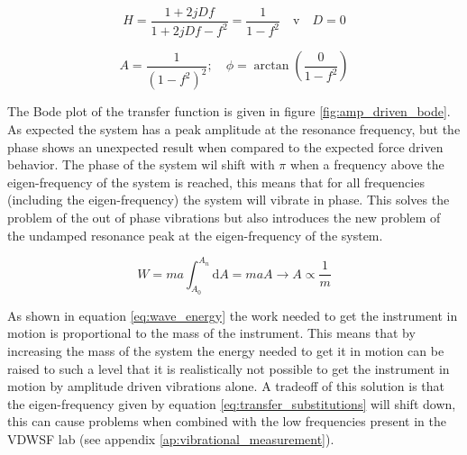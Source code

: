 \documentclass[10pt]{article}
\begin{document}
\begin{equation}
    H = \frac{1 + 2jDf}{1+ 2jDf - f^2} = \frac{1}{1 - f^2}\quad \mathrm{v}\quad D = 0
    \label{eq:trilling overdracht zonder demping}
\end{equation}

\begin{equation}
    A = \frac{1}{(1-f^2)^2}; \quad \phi = \arctan{\left( \frac{0}{1 - f^2}\right)}
    \label{eq:bode_amplitude}
\end{equation}

The Bode plot of the transfer function is given in figure \ref{fig:amp_driven_bode}.
As expected the system has a peak amplitude at the resonance frequency, but the phase shows an unexpected result when compared to the expected force driven behavior.
The phase of the system wil shift with $\pi$ when a frequency above the eigen-frequency of the system is reached, this means that for all frequencies (including the eigen-frequency) the system will vibrate in phase.
This solves the problem of the out of phase vibrations but also introduces the new problem of the undamped resonance peak at the eigen-frequency of the system.

\begin{equation}
  W = ma \int_{A_0}^{A_n} \mathrm{d}A = maA \rightarrow A \propto \frac{1}{m}
  \label{eq:wave_energy}
\end{equation}

As shown in equation \ref{eq:wave_energy} the work needed to get the instrument in motion is proportional to the mass of the instrument.
This means that by increasing the mass of the system the energy needed to get it in motion can be raised to such a level that it is realistically not possible to get the instrument in motion by amplitude driven vibrations alone.
A tradeoff of this solution is that the eigen-frequency given by equation \ref{eq:transfer_substitutions} will shift down, this can cause problems when combined with the low frequencies present in the VDWSF lab (see appendix \ref{ap:vibrational_measurement}).\\

\end{document}
